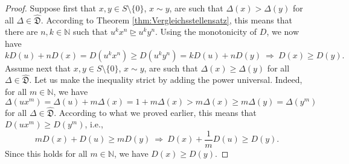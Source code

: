 \documentclass[10pt,a4paper]{amsart}
\newcommand{\N}{\mathbb N}
\newcommand{\mf}[1]{\mathfrak{#1}}
\newcommand{\rgeq}{\trianglerighteq}
\begin{document}
\begin{proof}
Suppose first that $x,y\in S\setminus\{0\}$, $x\sim y$, are such that $\Delta(x)>\Delta(y)$ for all $\Delta\in\hat{\mf D}$. According to Theorem \ref{thm:Vergleichsstellensatz}, this means that there are $n,k\in\N$ such that $u^k x^n\rgeq u^k y^n$. Using the monotonicity of $D$, we now have
$$
kD(u)+nD(x)=D(u^k x^n)\geq D(u^k y^n)=kD(u)+nD(y)\ \Rightarrow\ D(x)\geq D(y).
$$
Assume next that $x,y\in S\setminus\{0\}$, $x\sim y$, are such that $\Delta(x)\geq\Delta(y)$ for all $\Delta\in\hat{\mf D}$. Let us make the inequality strict by adding the power universal. Indeed, for all $m\in\N$, we have
$$
\Delta(ux^m)=\Delta(u)+m\Delta(x)=1+m\Delta(x)>m\Delta(x)\geq m\Delta(y)=\Delta(y^m)
$$
for all $\Delta\in\hat{\mf D}$. According to what we proved earlier, this means that $D(ux^m)\geq D(y^m)$, i.e.,
$$
mD(x)+D(u)\geq mD(y)\ \Rightarrow\ D(x)+\frac{1}{m}D(u)\geq D(y).
$$
Since this holds for all $m\in\N$, we have $D(x)\geq D(y)$.
\end{proof}
\end{document}
